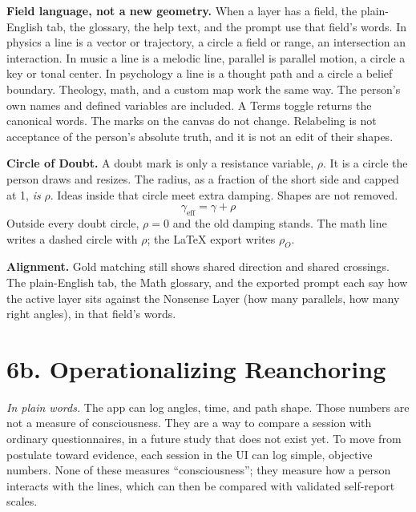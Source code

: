 \documentclass[11pt]{article}
\begin{document}
\textbf{Field language, not a new geometry.} When a layer has a field, the plain-English tab, the glossary, the help text, and the prompt use that field's words. In physics a line is a vector or trajectory, a circle a field or range, an intersection an interaction. In music a line is a melodic line, parallel is parallel motion, a circle a key or tonal center. In psychology a line is a thought path and a circle a belief boundary. Theology, math, and a custom map work the same way. The person's own names and defined variables are included. A Terms toggle returns the canonical words. The marks on the canvas do not change. Relabeling is not acceptance of the person's absolute truth, and it is not an edit of their shapes.

\textbf{Circle of Doubt.} A doubt mark is only a resistance variable, \(\rho\). It is a circle the person draws and resizes. The radius, as a fraction of the short side and capped at 1, \emph{is} \(\rho\). Ideas inside that circle meet extra damping. Shapes are not removed.
\begin{equation}
\gamma_{\mathrm{eff}}=\gamma+\rho
\end{equation}
Outside every doubt circle, \(\rho=0\) and the old damping stands. The math line writes a dashed circle with \(\rho\); the LaTeX export writes \(\rho_{O}\).

\textbf{Alignment.} Gold matching still shows shared direction and shared crossings. The plain-English tab, the Math glossary, and the exported prompt each say how the active layer sits against the Nonsense Layer (how many parallels, how many right angles), in that field's words.

\section*{6b. Operationalizing Reanchoring}
\textit{In plain words.} The app can log angles, time, and path shape. Those numbers are not a measure of consciousness. They are a way to compare a session with ordinary questionnaires, in a future study that does not exist yet.
To move from postulate toward evidence, each session in the UI can log simple, objective numbers. None of these measures ``consciousness''; they measure how a person interacts with the lines, which can then be compared with validated self-report scales.
\end{document}
